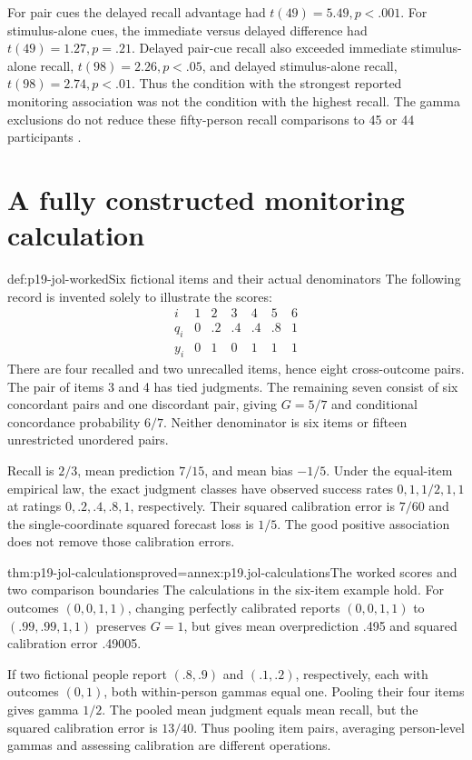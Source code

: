 For pair cues the delayed recall advantage had
\(t(49)=5.49,p<.001\). For stimulus-alone cues, the immediate
versus delayed difference had \(t(49)=1.27,p=.21\).
Delayed pair-cue recall also exceeded immediate stimulus-alone
recall, \(t(98)=2.26,p<.05\), and delayed stimulus-alone recall,
\(t(98)=2.74,p<.01\).
Thus the condition with the strongest reported monitoring
association was not the condition with the highest recall.
The gamma exclusions do not reduce these fifty-person recall
comparisons to 45 or 44 participants
\cite[p.~378]{DunloskyNelson1992CueJOL}.

\section{A fully constructed monitoring calculation}
\label{sec:p19-jol-worked}

\begin{hbexample}{def:p19-jol-worked}{Six fictional items and their actual denominators}
The following record is invented solely to illustrate the scores:
\[
\begin{array}{c|rrrrrr}
i&1&2&3&4&5&6\\\hline
q_i&0&.2&.4&.4&.8&1\\
y_i&0&1&0&1&1&1
\end{array}
\]
There are four recalled and two unrecalled items, hence eight
cross-outcome pairs. The pair of items 3 and 4 has tied judgments.
The remaining seven consist of six concordant pairs and one
discordant pair, giving \(G=5/7\) and conditional concordance
probability \(6/7\). Neither denominator is six items or fifteen
unrestricted unordered pairs.

Recall is \(2/3\), mean prediction \(7/15\), and mean bias
\(-1/5\). Under the equal-item empirical law, the exact judgment
classes have observed success rates \(0,1,1/2,1,1\) at
ratings \(0,.2,.4,.8,1\), respectively.
Their squared calibration error is \(7/60\) and the single-coordinate
squared forecast loss is \(1/5\).
The good positive association does not remove those calibration errors.
\end{hbexample}

\begin{hbtheorem}{thm:p19-jol-calculations}{proved=annex:p19.jol-calculations}{The worked scores and two comparison boundaries}
The calculations in the six-item example hold.
For outcomes \((0,0,1,1)\), changing perfectly calibrated reports
\((0,0,1,1)\) to \((.99,.99,1,1)\) preserves \(G=1\), but gives
mean overprediction .495 and squared calibration error .49005.

If two fictional people report \((.8,.9)\) and \((.1,.2)\),
respectively, each with outcomes \((0,1)\), both within-person
gammas equal one. Pooling their four items gives gamma \(1/2\).
The pooled mean judgment equals mean recall, but the squared
calibration error is \(13/40\).
Thus pooling item pairs, averaging person-level gammas and
assessing calibration are different operations.
\end{hbtheorem}

